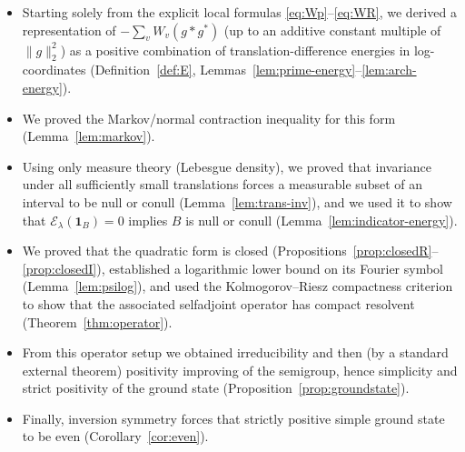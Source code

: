 \documentclass[11pt]{article}
\theoremstyle{remark}
\newcommand{\1}{\mathbf 1}
\begin{document}
\begin{itemize}
\item Starting solely from the explicit local formulas \eqref{eq:Wp}--\eqref{eq:WR}, we derived
a representation of $-\sum_v W_v(g*g^*)$ (up to an additive constant multiple of $\|g\|_2^2$) as a
positive combination of translation-difference energies in log-coordinates
(Definition~\ref{def:E}, Lemmas~\ref{lem:prime-energy}--\ref{lem:arch-energy}).
\item We proved the Markov/normal contraction inequality for this form (Lemma~\ref{lem:markov}).
\item Using only measure theory (Lebesgue density), we proved that invariance under all sufficiently small
translations forces a measurable subset of an interval to be null or conull (Lemma~\ref{lem:trans-inv}),
and we used it to show that $\mathcal E_\lambda(\1_B)=0$ implies $B$ is null or conull
(Lemma~\ref{lem:indicator-energy}).
\item We proved that the quadratic form is closed (Propositions~\ref{prop:closedR}--\ref{prop:closedI}),
established a logarithmic lower bound on its Fourier symbol (Lemma~\ref{lem:psilog}), and used
the Kolmogorov--Riesz compactness criterion to show that the associated selfadjoint operator
has compact resolvent (Theorem~\ref{thm:operator}).
\item From this operator setup we obtained irreducibility and then (by a standard external theorem)
positivity improving of the semigroup,
hence simplicity and strict positivity of the ground state (Proposition~\ref{prop:groundstate}).
\item Finally, inversion symmetry forces that strictly positive simple ground state to be even
(Corollary~\ref{cor:even}).
\end{itemize}
\end{document}
